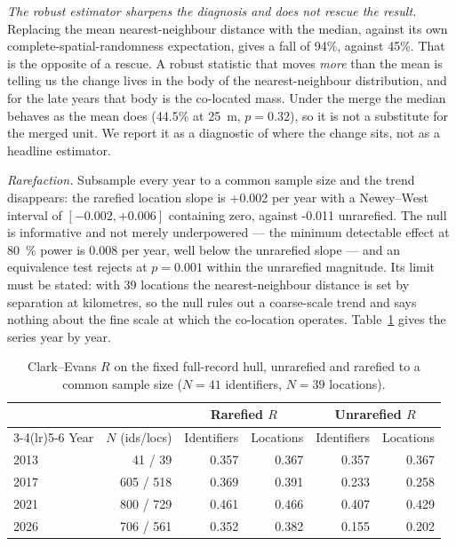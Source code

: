 \documentclass[fleqn,10pt,lineno]{wlpeerj}
\newcommand{\rRareMDE}{0.008}
\newcommand{\rRareLocSlope}{+0.002}
\newcommand{\rRareLocLO}{-0.002}
\newcommand{\rRareLocHI}{+0.006}
\newcommand{\rRareLocN}{39}
\newcommand{\rHullLocSlope}{-0.011}
\newcommand{\tostR}{0.001}
\begin{document}
\noindent\emph{The robust estimator sharpens the diagnosis and does not rescue the result.}
Replacing the mean nearest-neighbour distance with the median, against its own
complete-spatial-randomness expectation, gives a fall of \num{94}\%, against \num{45}\%. That
is the opposite of a rescue. A robust statistic that moves \emph{more} than the mean is telling
us the change lives in the body of the nearest-neighbour distribution, and for the late years
that body is the co-located mass. Under the merge the median behaves as the mean does
(\num{44.5}\% at \SI{25}{\meter}, $p = 0.32$), so it is not a substitute for the merged unit. We
report it as a diagnostic of where the change sits, not as a headline estimator.

\noindent\emph{Rarefaction.} Subsample every year to a common sample size and the trend
disappears: the rarefied location slope is \rRareLocSlope{} per year with a Newey--West interval
of $[\rRareLocLO, \rRareLocHI]$ containing zero, against \rHullLocSlope{} unrarefied. The null
is informative and not merely underpowered --- the minimum detectable effect at
\SI{80}{\percent} power is \rRareMDE{} per year, well below the unrarefied slope --- and an
equivalence test rejects at $p = \tostR$ within the unrarefied magnitude. Its limit must be
stated: with \rRareLocN{} locations the nearest-neighbour distance is set by separation at
kilometres, so the null rules out a coarse-scale trend and says nothing about the fine scale at
which the co-location operates. Table~\ref{tab:rare-r} gives the series year by year.

\begin{table}[htbp]
\centering
\caption{Clark--Evans $R$ on the fixed full-record hull, unrarefied and rarefied to a common sample size ($N = 41$ identifiers, $N = 39$ locations).}
\label{tab:rare-r}
\footnotesize
\setlength{\tabcolsep}{5pt}
\begin{tabular}{lrrrrr}
\toprule
 & & \multicolumn{2}{c}{Rarefied $R$} & \multicolumn{2}{c}{Unrarefied $R$} \\
\cmidrule(lr){3-4}\cmidrule(lr){5-6}
Year & $N$ (ids/locs) & Identifiers & Locations & Identifiers & Locations \\
\midrule
2013 & 41 / 39 & 0.357 & 0.367 & 0.357 & 0.367 \\
2017 & 605 / 518 & 0.369 & 0.391 & 0.233 & 0.258 \\
2021 & 800 / 729 & 0.461 & 0.466 & 0.407 & 0.429 \\
2026 & 706 / 561 & 0.352 & 0.382 & 0.155 & 0.202 \\
\bottomrule
\end{tabular}
\end{table}
\end{document}
